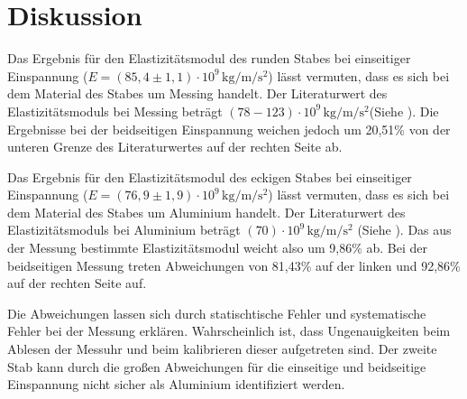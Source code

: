\section{Diskussion}
\label{sec:Diskussion}


Das Ergebnis für den Elastizitätsmodul des runden
Stabes bei einseitiger Einspannung ($E=(85,4 \pm 1,1) \cdot 10^{9} \,\si{\kilo\gram\per\meter\per\second\squared}$)
lässt vermuten, dass es sich bei dem Material des
Stabes um Messing handelt. Der Literaturwert 
des Elastizitätsmoduls bei Messing beträgt
$(78-123)\cdot 10^{9} \,\si{\kilo\gram\per\meter\per\second\squared}$(Siehe \cite{chemie}).
Die Ergebnisse bei der beidseitigen Einspannung weichen
jedoch um 20,51\% von der unteren Grenze des Literaturwertes
auf der rechten Seite ab.


Das Ergebnis für den Elastizitätsmodul des eckigen
Stabes bei einseitiger Einspannung ($E=(76,9 \pm 1,9) \cdot 10^{9} \,\si{\kilo\gram\per\meter\per\second\squared}$)
lässt vermuten, dass es sich bei dem Material des
Stabes um Aluminium handelt. Der Literaturwert 
des Elastizitätsmoduls bei Aluminium beträgt
$(70)\cdot 10^{9} \,\si{\kilo\gram\per\meter\per\second\squared}$ (Siehe \cite{chemie}).
Das aus der Messung bestimmte Elastizitätsmodul weicht also um 9,86\% ab.
Bei der beidseitigen Messung treten Abweichungen von 81,43\%
auf der linken und 92,86\% auf der rechten Seite auf.


Die Abweichungen lassen sich durch statischtische Fehler
und systematische Fehler bei der Messung erklären. 
Wahrscheinlich ist, dass Ungenauigkeiten beim Ablesen der Messuhr
und beim kalibrieren dieser aufgetreten sind.
Der zweite Stab kann durch die großen Abweichungen
für die einseitige und beidseitige Einspannung nicht sicher
als Aluminium identifiziert werden.
